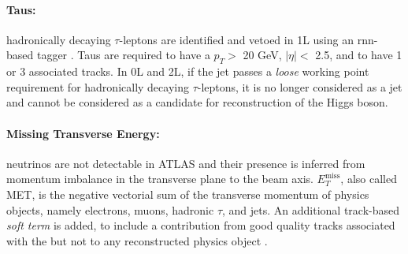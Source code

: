 \begin{table}[!htbp]
    \begin{center}
      \caption{Muon Selection requirements.} %
      \label{tbl:muonOb}
    \end{center}
  \end{table}
  
\paragraph{Taus:} hadronically decaying $\tau$-leptons are identified and vetoed in 1L using an \gls{rnn}-based tagger \cite{ATL-PHYS-PUB-2019-033}. Taus are required to have a $p_T >$ 20 GeV, $|\eta| <$ 2.5, and to have 1 or 3 associated tracks. In 0L and 2L, if the jet passes a \textit{loose} working point requirement for hadronically decaying $\tau$-leptons, it is no longer considered as a jet and cannot be considered as a candidate for reconstruction of the Higgs boson. %

\paragraph{Missing Transverse Energy:} neutrinos are not detectable in ATLAS and their presence is inferred from momentum imbalance in the transverse plane to the beam axis. $E_T^{\textrm{miss}}$, also called MET, is the negative vectorial sum of the transverse momentum of physics objects, namely electrons, muons, hadronic $\tau$, and jets. An additional track-based \textit{soft term} is added, to include a contribution from good quality tracks associated with the  but not to any reconstructed physics object \cite{ATLASmetReco}. %

